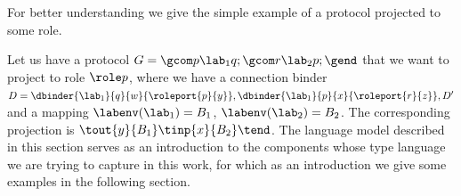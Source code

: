  
 
 
 
 
 
 
 
 
 
 For better understanding we give the simple example of a protocol projected to some role. 
 
 \example Let us have a protocol $G=\gcom p {\lab_1}{q};\gcom r {\lab_2}{p}; \gend$ that we want to project to role $\role p$, where we have a connection binder $ D =  \dbinder {\lab_1} { q}{w}{\roleport{p}{y}}, \dbinder {\lab_1} { p}{x}{\roleport{r}{z}}, D'$ and a mapping $\labenv({\lab_1})=B_1$, $\labenv({\lab_2})=B_2$. The corresponding projection is $\tout {y} {B_1} \tinp {x} {B_2} \tend$.
 The language model described in this section serves as an introduction to the components whose type language we are trying to capture in this work, for which as an introduction we give some examples  in the following section.  
 
 
 
 
 

